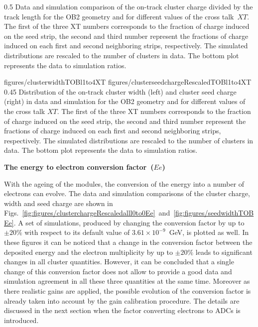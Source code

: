                  {0.5}       %
                 { Data and simulation comparison of the on-track cluster charge divided by the track length for the OB2 geometry and for different values of the cross talk~$XT$. The first of the three XT numbers corresponds to the fraction of charge induced on the seed strip, the second and third number represent the fractions of charge induced on each first and second neighboring strips, respectively. The simulated distributions are rescaled to the number of clusters in data. The bottom plot represents the data to simulation ratios.}

                 {figures/clusterwidthTOBl1to4XT}
                 {figures/clusterseedchargeRescaledTOBl1to4XT} %
                 {0.45}       %
                 { Distribution of the on-track cluster width (left) and cluster seed charge (right) in data and simulation for the OB2 geometry and for different values of the cross talk $XT$. The first of the three XT numbers corresponds to the fraction of charge induced on the seed strip, the second and third number represent the fractions of charge induced on each first and second neighboring strips, respectively. The simulated distributions are rescaled to the number of clusters in data. The bottom plot represents the data to simulation ratios. } 


\textbf{The energy to electron conversion factor~($Ee$)}

With the ageing of the modules, the conversion of the energy into a number of electrons can evolve. The data and simulation comparisons of the cluster charge, width and seed charge are shown in Figs.~\ref{fig:figures/clusterchargeRescaledalll0to0Ee}~and~\ref{fig:figures/seedwidthTOBEe}. A set of simulations, produced by changing the conversion factor by up to $\pm 20\%$ with respect to its default value of $3.61 \times 10^{-9}$~GeV, is plotted as well. In these figures it can be noticed that a change in the conversion factor between the deposited energy and the electron multiplicity by up to $\pm 20\%$ leads to significant changes in all cluster quantities. However, it can be concluded that a single change of this conversion factor does not allow to provide a good data and simulation agreement in all these three quantities at the same time. Moreover as there realistic gains are applied, the possible evolution of the conversion factor is already taken into account by the gain calibration procedure. The details are discussed in the next section when the factor converting electrons to ADCs is introduced.

